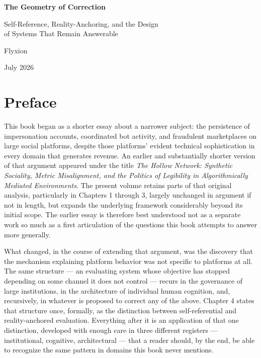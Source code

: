 \documentclass[12pt,a4paper]{book}
\begin{document}
\frontmatter


\begin{titlepage}
\centering
\vspace*{3cm}
{\LARGE\bfseries The Geometry of Correction\par}
\vspace{1em}
{\large Self-Reference, Reality-Anchoring, and the Design\\[0.3em]
of Systems That Remain Answerable\par}
\vspace{2em}
{\large Flyxion\par}
\vspace{1em}
{\large July 2026\par}
\vfill
\end{titlepage}

\newpage


\chapter*{Preface}

This book began as a shorter essay about a narrower subject: the persistence of impersonation accounts, coordinated bot activity, and fraudulent marketplaces on large social platforms, despite those platforms' evident technical sophistication in every domain that generates revenue. An earlier and substantially shorter version of that argument appeared under the title \emph{The Hollow Network: Synthetic Sociality, Metric Misalignment, and the Politics of Legibility in Algorithmically Mediated Environments}. The present volume retains parts of that original analysis, particularly in Chapters 1 through 3, largely unchanged in argument if not in length, but expands the underlying framework considerably beyond its initial scope. The earlier essay is therefore best understood not as a separate work so much as a first articulation of the questions this book attempts to answer more generally.

What changed, in the course of extending that argument, was the discovery that the mechanism explaining platform behavior was not specific to platforms at all. The same structure — an evaluating system whose objective has stopped depending on some channel it does not control — recurs in the governance of large institutions, in the architecture of individual human cognition, and, recursively, in whatever is proposed to correct any of the above. Chapter 4 states that structure once, formally, as the distinction between self-referential and reality-anchored evaluation. Everything after it is an application of that one distinction, developed with enough care in three different registers — institutional, cognitive, architectural — that a reader should, by the end, be able to recognize the same pattern in domains this book never mentions.
\end{document}
